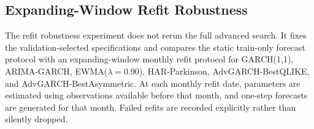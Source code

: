 \subsection{Expanding-Window Refit Robustness}

The refit robustness experiment does not rerun the full advanced search. It fixes the validation-selected specifications and compares the static train-only forecast protocol with an expanding-window monthly refit protocol for GARCH(1,1), ARIMA-GARCH, EWMA(\(\lambda=0.90\)), HAR-Parkinson, AdvGARCH-BestQLIKE, and AdvGARCH-BestAsymmetric. At each monthly refit date, parameters are estimated using observations available before that month, and one-step forecasts are generated for that month. Failed refits are recorded explicitly rather than silently dropped.
